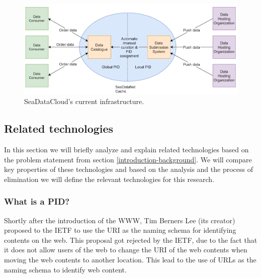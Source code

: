 
\begin{figure}[H]
\centering
\includegraphics[scale=0.6]{Images/SDC_current.png}
\caption{SeaDataCloud's current infrastructure.}
\label{fig:sdc_cur}
\end{figure}

\subsection{Related technologies}
In this section we will briefly analyze and explain related technologies based on the problem statement from section \ref{introduction-background}. We will compare key properties of these technologies and based on the analysis and the process of elimination we will define the relevant technologies for this research.

\subsubsection{What is a PID?}\label{pid-intr}
Shortly after the introduction of the WWW, Tim Berners Lee (its creator) proposed to the IETF to use the URI as the naming schema for identifying contents on the web. This proposal got rejected by the IETF, due to the fact that it does not allow users of the web to change the URI of the web contents when moving the web contents to another location. This lead to the use of URLs as the naming schema to identify web content. 
 
